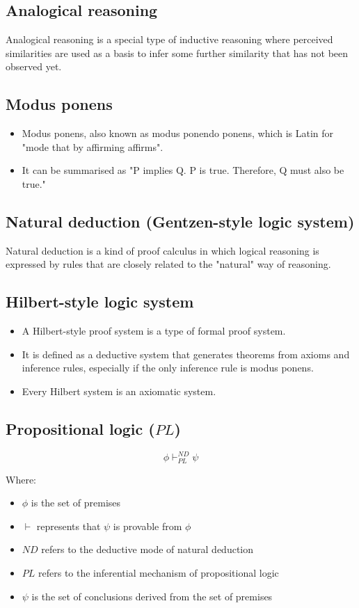 \documentclass[11pt]{article}
\begin{document}
\subsection{Analogical reasoning}
\label{sec:org61acfea}
Analogical reasoning is a special type of inductive reasoning where perceived similarities are used as a basis to infer some further similarity that has not been observed yet.
\subsection{Modus ponens}
\label{sec:orgdba6a61}
\begin{itemize}
\item Modus ponens, also known as modus ponendo ponens, which is Latin for "mode that by affirming affirms".
\item It can be summarised as "P implies Q. P is true. Therefore, Q must also be true."
\end{itemize}
\subsection{Natural deduction (Gentzen-style logic system)}
\label{sec:org845dd70}
Natural deduction is a kind of proof calculus in which logical reasoning is expressed by rules that are closely related to the "natural" way of reasoning.
\subsection{Hilbert-style logic system}
\label{sec:org16a6c5a}
\begin{itemize}
\item A Hilbert-style proof system is a type of formal proof system.
\item It is defined as a deductive system that generates theorems from axioms and inference rules, especially if the only inference rule is modus ponens.
\item Every Hilbert system is an axiomatic system.
\end{itemize}
\subsection{Propositional logic (\(PL\))}
\label{sec:org6118fea}
\[\phi \vdash^{ND}_{PL} \psi\]

Where:
\begin{itemize}
\item \(\phi\) is the set of premises
\item \(\vdash\) represents that \(\psi\) is provable from \(\phi\)
\item \(ND\) refers to the deductive mode of natural deduction
\item \(PL\) refers to the inferential mechanism of propositional logic
\item \(\psi\) is the set of conclusions derived from the set of premises
\end{itemize}
\end{document}
